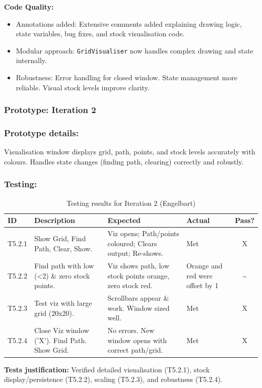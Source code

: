 \textbf{Code Quality:}
\begin{itemize}
	\item Annotations added: Extensive comments added explaining drawing logic, state variables, bug fixes, and stock visualisation code.
	\item Modular approach: \verb|GridVisualiser| now handles complex drawing and state internally.
	\item Robustness: Error handling for closed window. State management more reliable. Visual stock levels improve clarity.
\end{itemize}

\newpage
\subsubsection*{Prototype: Iteration 2}




\subsubsection{Prototype details:}
Visualisation window displays grid, path, points, and stock levels accurately with colours. Handles state changes (finding path, clearing) correctly and robustly.

\subsubsection{Testing:}
\begin{table}[htbp]
	\centering
	\begin{tabularx}{\textwidth}{|l|X|p{4.5cm}|p{1.5cm}|c|}
		\hline
		\textbf{ID} & \textbf{Description} & \textbf{Expected} & \textbf{Actual} & \textbf{Pass?} \\
		\hline
		T5.2.1 & Show Grid, Find Path, Clear, Show. & Viz opens; Path/points coloured; Clears output; Re-shows. & Met & X \\
		\hline
		T5.2.2 & Find path with low (<2) \& zero stock points. & Viz shows path, low stock points orange, zero stock red. & Orange and red were offset by 1 & \~{} \\
		\hline
		T5.2.3 & Test viz with large grid (20x20). & Scrollbars appear \& work. Window sized well. & Met & X \\
		\hline
		T5.2.4 & Close Viz window ('X'). Find Path. Show Grid. & No errors. New window opens with correct path/grid. & Met & X \\
		\hline
	\end{tabularx}
	\caption{Testing results for Iteration 2 (Engelbart)}
\end{table}
\textbf{Tests justification:} Verified detailed visualisation (T5.2.1), stock display/persistence (T5.2.2), scaling (T5.2.3), and robustness (T5.2.4).

